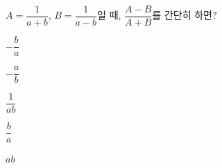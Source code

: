 \hspace*{2mm}\begin{minipage}[t]{\dimexpr\linewidth-2mm\relax}\vspace{0pt}
$A=\dfrac{1}{a+b}$, $B=\dfrac{1}{a-b}$일 때, $\dfrac{A-B}{A+B}$를 간단히 하면?
\begin{choices32}{\rule[-3ex]{0pt}{8ex}$-\dfrac{b}{a}$}{\rule[-3ex]{0pt}{8ex}$-\dfrac{a}{b}$}{\rule[-3ex]{0pt}{8ex}$\dfrac{1}{ab}$}{\rule[-3ex]{0pt}{8ex}$\dfrac{b}{a}$}{\rule[-3ex]{0pt}{8ex}$ab$}\end{choices32}\end{minipage}

